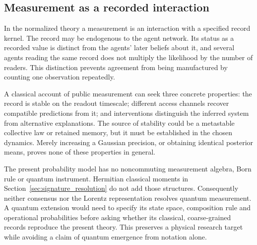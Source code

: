 \subsection{Measurement as a recorded interaction}
\label{sec:measurement_analogy}

In the normalized theory a measurement is an interaction with a specified record kernel. The record may be endogenous to the agent network. Its status as a recorded value is distinct from the agents' later beliefs about it, and several agents reading the same record does not multiply the likelihood by the number of readers. This distinction prevents agreement from being manufactured by counting one observation repeatedly.

A classical account of public measurement can seek three concrete properties: the record is stable on the readout timescale; different access channels recover compatible predictions from it; and interventions distinguish the inferred system from alternative explanations. The source of stability could be a metastable collective law or retained memory, but it must be established in the chosen dynamics. Merely increasing a Gaussian precision, or obtaining identical posterior means, proves none of these properties in general.

The present probability model has no noncommuting measurement algebra, Born rule or quantum instrument. Hermitian classical moments in Section~\ref{sec:signature_resolution} do not add those structures. Consequently neither consensus nor the Lorentz representation resolves quantum measurement. A quantum extension would need to specify its state space, composition rule and operational probabilities before asking whether its classical, coarse-grained records reproduce the present theory. This preserves a physical research target while avoiding a claim of quantum emergence from notation alone.

